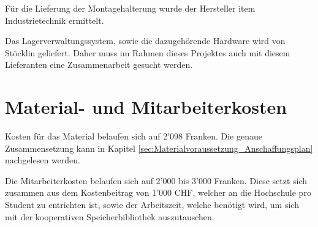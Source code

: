 Für die Lieferung der Montagehalterung wurde der Hersteller item Industrietechnik ermittelt.

Das Lagerverwaltungssystem, sowie die dazugehörende Hardware wird von Stöcklin geliefert. Daher muss im Rahmen dieses Projektes auch mit diesem Lieferanten eine Zusammenarbeit gesucht werden.

\section{Material- und Mitarbeiterkosten}
Kosten für das Material belaufen sich auf 2'098 Franken. Die genaue Zusammensetzung kann in Kapitel \ref{sec:Materialvoraussetzung_Anschaffungsplan} nachgelesen werden.

Die Mitarbeiterkosten belaufen sich auf 2'000 bis 3'000 Franken. Diese setzt sich zusammen aus dem Kostenbeitrag von 1'000 CHF, welcher an die Hochschule pro Student zu entrichten ist, sowie der Arbeitszeit, welche benötigt wird, um sich mit der kooperativen Speicherbibliothek auszutauschen.
